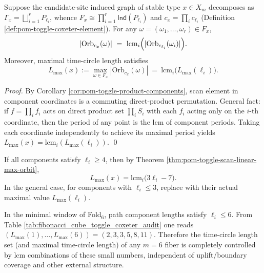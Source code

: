 \begin{theorem}\label{thm:pom-toggle-scan-lcm-tensorization}
Suppose the candidate-site induced graph of stable type \(x\in X_m\) decomposes as \(\Gamma_x=\bigsqcup_{i=1}^r P_{\ell_i}\), whence
\(
F_x\cong \prod_{i=1}^r \mathsf{Ind}(P_{\ell_i})
\)
and \(c_x=\prod_i c_{\ell_i}\) (Definition \ref{def:pom-toggle-coxeter-element}).
For any \(\omega=(\omega_1,\dots,\omega_r)\in F_x\),
\[
|\mathrm{Orb}_{c_x}(\omega)|
\ =\
\mathrm{lcm}_{i}\Bigl(|\mathrm{Orb}_{c_{\ell_i}}(\omega_i)|\Bigr).
\]
Moreover, maximal time-circle length satisfies
\[
L_{\max}(x):=\max_{\omega\in F_x} |\mathrm{Orb}_{c_x}(\omega)|
\ =\
\mathrm{lcm}_{i}\bigl(L_{\max}(\ell_i)\bigr).
\]
\end{theorem}
\begin{proof}
By Corollary \ref{cor:pom-toggle-product-components}, scan element in component coordinates is a commuting direct-product permutation.
General fact: if \(f=\prod_i f_i\) acts on direct product set \(\prod_i S_i\) with each \(f_i\) acting only on the \(i\)-th coordinate, then the period of any point is the lcm of component periods.
Taking each coordinate independently to achieve its maximal period yields \(L_{\max}(x)=\mathrm{lcm}_i(L_{\max}(\ell_i))\). \qed
\end{proof}

\begin{corollary}\label{cor:pom-toggle-scan-max-orbit-arithmetic}
If all components satisfy \(\ell_i\ge 4\), then by Theorem \ref{thm:pom-toggle-scan-linear-max-orbit},
\[
L_{\max}(x)=\mathrm{lcm}_{i}\bigl(3\ell_i-7\bigr).
\]
In the general case, for components with \(\ell_i\le 3\), replace with their actual maximal value \(L_{\max}(\ell_i)\).
\end{corollary}

\begin{remark}\label{rem:pom-toggle-fold6-lmax}
In the minimal window of Fold\(_6\), path component lengths satisfy \(\ell_i\le 6\).
From Table \ref{tab:fibonacci_cube_toggle_coxeter_audit} one reads
\(
(L_{\max}(1),\dots,L_{\max}(6))=(2,3,3,5,8,11)
\).
Therefore the time-circle length set (and maximal time-circle length) of any \(m=6\) fiber is completely controlled by \(\mathrm{lcm}\) combinations of these small numbers, independent of uplift/boundary coverage and other external structure.
\end{remark}

